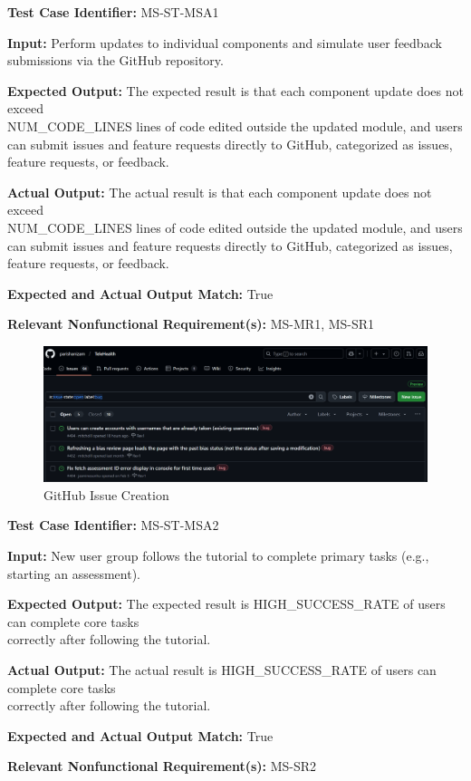 \documentclass[12pt, titlepage]{article}
\begin{document}
\begin{mdframed}[linewidth=0.5mm] \par
  \textbf{Test Case Identifier:} MS-ST-MSA1 \par
  \textbf{Input:} Perform updates to individual components and simulate user feedback submissions via the GitHub repository. \par
  \textbf{Expected Output:} The expected result is that each component update does not exceed \\NUM\_CODE\_LINES lines of code edited outside the updated module, and users can submit issues and feature requests directly to GitHub, categorized as issues, feature requests, or feedback. \par
  \textbf{Actual Output:} The actual result is that each component update does not exceed \\NUM\_CODE\_LINES lines of code edited outside the updated module, and users can submit issues and feature requests directly to GitHub, categorized as issues, feature requests, or feedback. \par
  \textbf{Expected and Actual Output Match:} True \par
  \textbf{Relevant Nonfunctional Requirement(s):} MS-MR1, MS-SR1
\end{mdframed}

\begin{figure}[h]
  \centering
  \includegraphics[width=1\textwidth]{images/MS-ST-MSA1.png}
  \caption{GitHub Issue Creation \cite{GithubIssues}}
\end{figure}

\begin{mdframed}[linewidth=0.5mm] \par
  \textbf{Test Case Identifier:} MS-ST-MSA2 \par
  \textbf{Input:} New user group follows the tutorial to complete primary tasks (e.g., starting an assessment). \par
  \textbf{Expected Output:} The expected result is HIGH\_SUCCESS\_RATE of users can complete core tasks \\correctly after following the tutorial. \par
  \textbf{Actual Output:} The actual result is HIGH\_SUCCESS\_RATE of users can complete core tasks \\correctly after following the tutorial. \par
  \textbf{Expected and Actual Output Match:} True \par
  \textbf{Relevant Nonfunctional Requirement(s):} MS-SR2
\end{mdframed}
\end{document}
